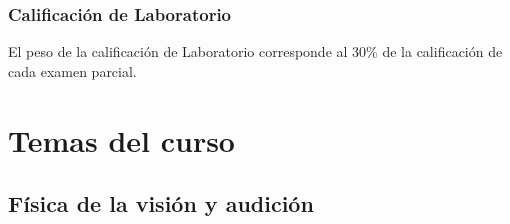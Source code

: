 \documentclass[14pt]{beamer}
\begin{document}
\begin{frame}
\frametitle{Calificación de Laboratorio}
El peso de la calificación de Laboratorio corresponde al $30 \%$ de la calificación de cada examen parcial.
\end{frame}

\section{Temas del curso}
\subsection{Física de la visión y audición}
\end{document}
